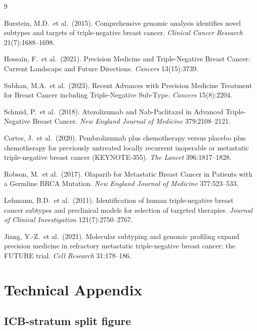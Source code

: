 \documentclass{article}
\begin{document}
\medskip
\small
\begin{thebibliography}{9}

Burstein, M.D.\ et al.\ (2015).
Comprehensive genomic analysis identifies novel subtypes and targets of triple-negative breast cancer.
\textit{Clinical Cancer Research} 21(7):1688--1698.

Hossain, F.\ et al.\ (2021).
Precision Medicine and Triple-Negative Breast Cancer: Current Landscape and Future Directions.
\textit{Cancers} 13(15):3739.

Subhan, M.A.\ et al.\ (2023).
Recent Advances with Precision Medicine Treatment for Breast Cancer including Triple-Negative Sub-Type.
\textit{Cancers} 15(8):2204.

Schmid, P.\ et al.\ (2018).
Atezolizumab and Nab-Paclitaxel in Advanced Triple-Negative Breast Cancer.
\textit{New England Journal of Medicine} 379:2108--2121.

Cortes, J.\ et al.\ (2020).
Pembrolizumab plus chemotherapy versus placebo plus chemotherapy for previously untreated locally recurrent inoperable or metastatic triple-negative breast cancer (KEYNOTE-355).
\textit{The Lancet} 396:1817--1828.

Robson, M.\ et al.\ (2017).
Olaparib for Metastatic Breast Cancer in Patients with a Germline BRCA Mutation.
\textit{New England Journal of Medicine} 377:523--533.

Lehmann, B.D.\ et al.\ (2011).
Identification of human triple-negative breast cancer subtypes and preclinical models for selection of targeted therapies.
\textit{Journal of Clinical Investigation} 121(7):2750--2767.

Jiang, Y.-Z.\ et al.\ (2021).
Molecular subtyping and genomic profiling expand precision medicine in refractory metastatic triple-negative breast cancer: the FUTURE trial.
\textit{Cell Research} 31:178--186.

\end{thebibliography}
\normalsize

\appendix
\section{Technical Appendix}
\label{sec:appendix}

\subsection{ICB-stratum split figure}
\end{document}
